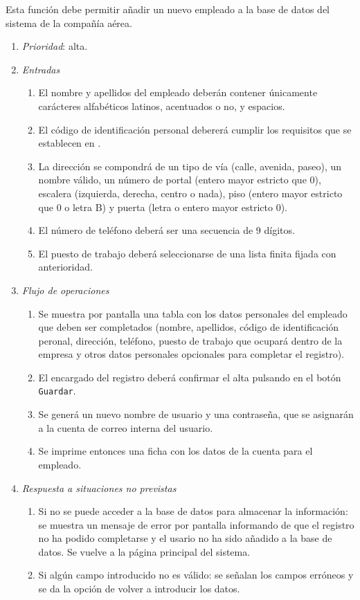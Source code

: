  \label{fun:registrarempleado}
	Esta función debe permitir añadir un nuevo empleado a la base de datos del sistema de la compañía aérea.

\begin{enumerate}
	\item \textit{Prioridad}: alta.
	\item \textit{Entradas}
	\begin{enumerate}
		\item El nombre y apellidos del empleado deberán contener únicamente carácteres alfabéticos latinos, acentuados o no, y espacios.
		\item El código de identificación personal debererá cumplir los requisitos que se establecen en .
		\item La dirección se compondrá de un tipo de vía (calle, avenida, paseo), un nombre válido, un número de portal (entero mayor estricto que 0), escalera (izquierda, derecha, centro o nada), piso (entero mayor estricto que 0 o letra B) y puerta (letra o entero mayor estricto 0).
		\item El número de teléfono deberá ser una secuencia de 9 dígitos.
		\item El puesto de trabajo deberá seleccionarse de una lista finita fijada con anterioridad.
	\end{enumerate}
	\item \textit{Flujo de operaciones}
	\begin{enumerate}
		\item Se muestra por pantalla una tabla con los datos personales del empleado que deben ser completados (nombre, apellidos, código de identificación peronal, dirección, teléfono, puesto de trabajo que ocupará dentro de la empresa y otros datos personales opcionales para completar el registro).
		\item El encargado del registro deberá confirmar el alta pulsando en el botón \verb|Guardar|.
		\item Se generá un nuevo nombre de usuario y una contraseña, que se asignarán a la cuenta de correo interna del usuario.
		\item Se imprime entonces una ficha con los datos de la cuenta para el empleado.
	\end{enumerate}
	\item \textit{Respuesta a situaciones no previstas}
	\begin{enumerate}
		\item Si no se puede acceder a la base de datos para almacenar la información: se muestra un mensaje de error por pantalla informando de que el registro no ha podido completarse y el usario no ha sido añadido a la base de datos. Se vuelve a la página principal del sistema.
		\item Si algún campo introducido no es válido: se señalan los campos erróneos y se da la opción de volver a introducir los datos.
	\end{enumerate}

\end{enumerate}
